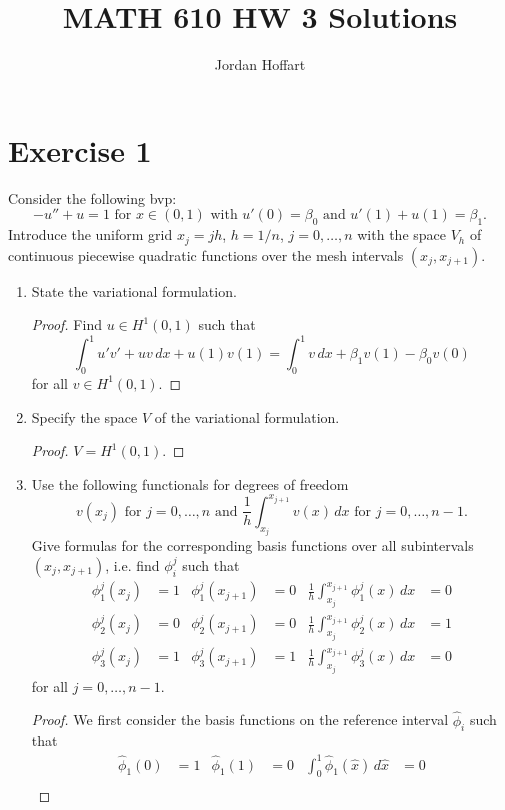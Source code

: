 \documentclass{article}
\title{MATH 610 HW 3 Solutions}
\author{Jordan Hoffart}
\date{}
\begin{document}
\maketitle
\section*{Exercise 1}
Consider the following bvp: \[-u'' + u = 1 \text{ for } x \in (0,1) \text{ with } u'(0) = \beta_0 \text{ and } u'(1) + u(1) = \beta_1.\]
Introduce the uniform grid $x_j = jh$, $h = 1/n$, $j = 0,\dots,n$ with the space $V_h$ of continuous piecewise quadratic functions over the mesh intervals $(x_j,x_{j+1})$.
\begin{enumerate}
	\item State the variational formulation.
	      \begin{proof}
		      Find $u \in H^1(0,1)$ such that \[\int_0^1u'v'+uv\,dx + u(1)v(1) = \int_0^1v\,dx + \beta_1v(1) - \beta_0v(0)\] for all $v \in H^1(0,1)$.
	      \end{proof}
	\item Specify the space $V$ of the variational formulation.
	      \begin{proof}
		      $V = H^1(0,1)$.
	      \end{proof}
	\item Use the following functionals for degrees of freedom \[v(x_j) \text{ for } j = 0,\dots,n \text{ and } \frac{1}{h}\int_{x_j}^{x_{j+1}}v(x)\,dx \text{ for } j = 0,\dots,n-1.\]
	      Give formulas for the corresponding basis functions over all subintervals $(x_j,x_{j+1})$, i.e. find $\phi_i^j$ such that
	      \begin{align*}
		      \phi_1^j(x_j) & = 1 & \phi_1^j(x_{j+1}) & = 0 & \frac{1}{h}\int_{x_j}^{x_{j+1}}\phi_1^j(x)\,dx & = 0 \\
		      \phi_2^j(x_j) & = 0 & \phi_2^j(x_{j+1}) & = 0 & \frac{1}{h}\int_{x_j}^{x_{j+1}}\phi_2^j(x)\,dx & = 1 \\
		      \phi_3^j(x_j) & = 1 & \phi_3^j(x_{j+1}) & = 1 & \frac{1}{h}\int_{x_j}^{x_{j+1}}\phi_3^j(x)\,dx & = 0
	      \end{align*}
	      for all $j = 0,\dots,n-1$.
	      \begin{proof}
		      We first consider the basis functions on the reference interval $\widehat\phi_i$ such that
		      \begin{align*}
			      \widehat \phi_1(0) & = 1 & \widehat \phi_1(1) & = 0 & \int_0^1\widehat \phi_1(\widehat x)\,d\widehat x & = 0 \\

\end{align*}
\end{proof}
\end{enumerate}
\end{document}
